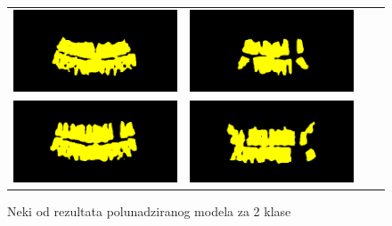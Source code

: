 \begin{figure}
\begin{tabular}{cccc}
\hspace{-1.5cm}
{\includegraphics[width = 8cm]{slike/rezultati/semisuper2klase1.png}} &
{\includegraphics[width = 8cm]{slike/rezultati/semisuper2klase2.png}}\\
\hspace{-1.5cm}
{\includegraphics[width = 8cm]{slike/rezultati/semisuper2klase3.png}} &
{\includegraphics[width = 8cm]{slike/rezultati/semisuper2klase4.png}}\\
\end{tabular}
\caption{Neki od rezultata polunadziranog modela za 2 klase}
\end{figure}


